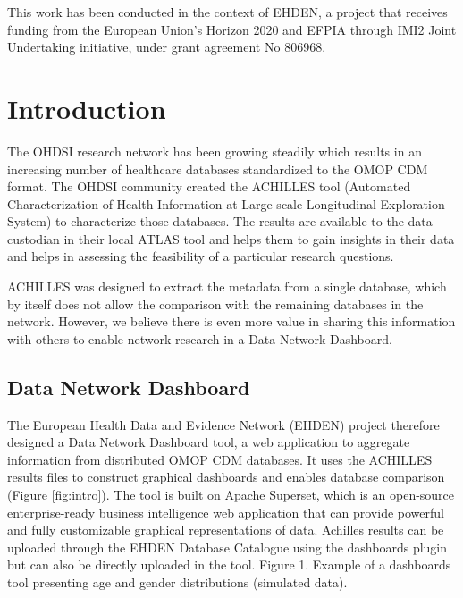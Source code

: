 \documentclass[
]{book}
\begin{document}
This work has been conducted in the context of EHDEN, a project that receives funding from the European Union's Horizon 2020 and EFPIA through IMI2 Joint Undertaking initiative, under grant agreement No 806968.

\hypertarget{introduction}{%
\chapter{Introduction}\label{introduction}}

The OHDSI research network has been growing steadily which results in an increasing number of healthcare databases standardized to the OMOP CDM format. The OHDSI community created the ACHILLES tool (Automated Characterization of Health Information at Large-scale Longitudinal Exploration System) to characterize those databases. The results are available to the data custodian in their local ATLAS tool and helps them to gain insights in their data and helps in assessing the feasibility of a particular research questions.

ACHILLES was designed to extract the metadata from a single database, which by itself does not allow the comparison with the remaining databases in the network. However, we believe there is even more value in sharing this information with others to enable network research in a Data Network Dashboard.

\hypertarget{data-network-dashboard}{%
\section{Data Network Dashboard}\label{data-network-dashboard}}

The European Health Data and Evidence Network (EHDEN) project therefore designed a Data Network Dashboard tool, a web application to aggregate information from distributed OMOP CDM databases. It uses the ACHILLES results files to construct graphical dashboards and enables database comparison (Figure \ref{fig:intro}). The tool is built on Apache Superset, which is an open-source enterprise-ready business intelligence web application that can provide powerful and fully customizable graphical representations of data. Achilles results can be uploaded through the EHDEN Database Catalogue using the dashboards plugin but can also be directly uploaded in the tool. Figure 1. Example of a dashboards tool presenting age and gender distributions (simulated data).
\end{document}
